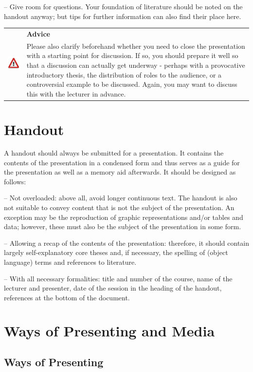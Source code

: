 \documentclass[
  english,
]{scrreprt}
\newlength{\iconwidth}
\newenvironment{displaybox}[2]{%
    \begin{center}
        \setlength\arrayrulewidth{0.75pt}%
        \arrayrulecolor{white}%
        \renewcommand{\arraystretch}{1.3}%
        \begin{tabular}{p{\iconwidth}p{\linewidth-4\tabcolsep-\iconwidth}}
            \multirow{2}{*}{#2}&\cellcolor{boxheadcol}\textbf{\sffamily\color{white}#1} \\%
            \hhline{~-}%
            &\cellcolor{boxcol}%
}{%
            \\
        \end{tabular}
        \arrayrulecolor{black}
    \end{center}
}
\newenvironment{Advice}{%
\begin{displaybox}{Advice}{\includegraphics[width=\iconwidth]{images/icon-hinweis}}}%
{\end{displaybox}}
\begin{document}
– Give room for questions. Your foundation of literature should be noted on the handout anyway; but tips for further information can also find their place here.

\begin{Advice}

Please also clarify beforehand whether you need to close the presentation with a starting point for discussion. If so, you should prepare it well so that a discussion can actually get underway - perhaps with a provocative introductory thesis, the distribution of roles to the audience, or a controversial example to be discussed. Again, you may want to discuss this with the lecturer in advance.

\end{Advice}

\section{Handout}\label{sec:handout}

A handout should always be submitted for a presentation. It contains the contents of the presentation in a condensed form and thus serves as a guide for the presentation as well as a memory aid afterwards. It should be designed as follows:

– Not overloaded: above all, avoid longer continuous text. The handout is also not suitable to convey content that is not the subject of the presentation. An exception may be the reproduction of graphic representations and/or tables and data; however, these must also be the subject of the presentation in some form.

– Allowing a recap of the contents of the presentation: therefore, it should contain largely self-explanatory core theses and, if necessary, the spelling of (object language) terms and references to literature.

– With all necessary formalities: title and number of the course, name of the lecturer and presenter, date of the session in the heading of the handout, references at the bottom of the document.

\section{Ways of Presenting and Media}\label{ways-of-presenting-and-media}

\subsection{Ways of Presenting}\label{ways-of-presenting}
\end{document}
